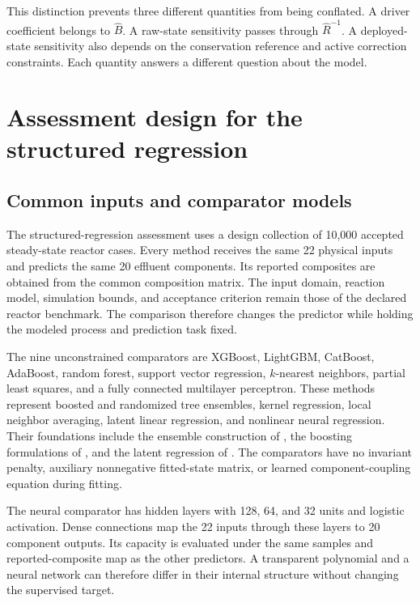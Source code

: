 This distinction prevents three different quantities from being conflated. A driver coefficient belongs to \(\widehat B\). A raw-state sensitivity passes through \(\widehat R^{-1}\). A deployed-state sensitivity also depends on the conservation reference and active correction constraints. Each quantity answers a different question about the model.

\section{Assessment design for the structured regression}

\subsection{Common inputs and comparator models}

The structured-regression assessment uses a design collection of 10,000 accepted steady-state reactor cases. Every method receives the same 22 physical inputs and predicts the same 20 effluent components. Its reported composites are obtained from the common composition matrix. The input domain, reaction model, simulation bounds, and acceptance criterion remain those of the declared reactor benchmark. The comparison therefore changes the predictor while holding the modeled process and prediction task fixed.

The nine unconstrained comparators are XGBoost, LightGBM, CatBoost, AdaBoost, random forest, support vector regression, \(k\)-nearest neighbors, partial least squares, and a fully connected multilayer perceptron. These methods represent boosted and randomized tree ensembles, kernel regression, local neighbor averaging, latent linear regression, and nonlinear neural regression. Their foundations include the ensemble construction of \citet{Breiman2001}, the boosting formulations of \citet{Drucker1997,ChenGuestrin2016,Ke2017,Prokhorenkova2018}, and the latent regression of \citet{Wold2001}. The comparators have no invariant penalty, auxiliary nonnegative fitted-state matrix, or learned component-coupling equation during fitting.

The neural comparator has hidden layers with 128, 64, and 32 units and logistic activation. Dense connections map the 22 inputs through these layers to 20 component outputs. Its capacity is evaluated under the same samples and reported-composite map as the other predictors. A transparent polynomial and a neural network can therefore differ in their internal structure without changing the supervised target.

